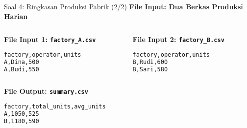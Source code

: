 \documentclass[aspectratio=169, table]{beamer}
\begin{document}
\begin{frame}[fragile]{Soal 4: Ringkasan Produksi Pabrik (2/2)}
\vspace{10pt}
\textbf{File Input: Dua Berkas Produksi Harian}

\begin{columns}[t]
  \begin{column}{0.48\textwidth}
  \textbf{File Input 1: \texttt{factory\_A.csv}}
  \begin{lstlisting}[language=bash,basicstyle=\ttfamily\small]
factory,operator,units
A,Dina,500
A,Budi,550
  \end{lstlisting}
  \end{column}

  \begin{column}{0.48\textwidth}
  \textbf{File Input 2: \texttt{factory\_B.csv}}
  \begin{lstlisting}[language=bash,basicstyle=\ttfamily\small]
factory,operator,units
B,Rudi,600
B,Sari,580
  \end{lstlisting}
  \end{column}
\end{columns}

\vspace{5pt}
\textbf{File Output: \texttt{summary.csv}}
\begin{lstlisting}[language=bash,basicstyle=\ttfamily\small]
factory,total_units,avg_units
A,1050,525
B,1180,590
\end{lstlisting}
\end{frame}
\end{document}
